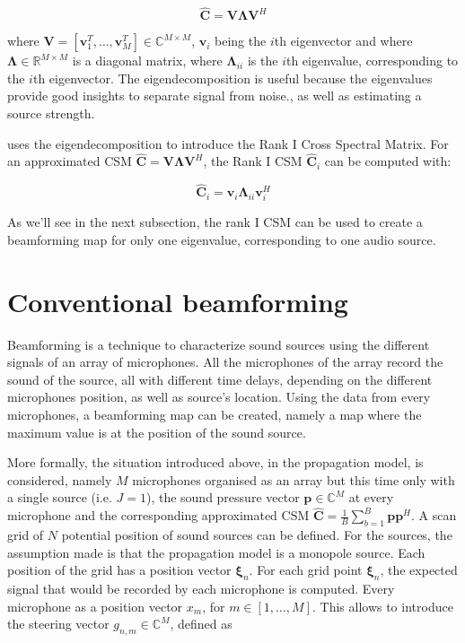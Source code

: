 \documentclass[11pt,a4paper,twoside]{report}
\begin{document}
\begin{equation}
    \label{eigendecomposition}
    \hat{\mathbf{C}} = \mathbf{V} \mathbf{\Lambda} \mathbf{V}^H
\end{equation}

where $\mathbf{V} = [\mathbf{v}_1^T, \dots, \mathbf{v}_M^T] \in \mathbb{C}^{M \times M}$, $\mathbf{v}_i$ being the $i$th eigenvector and where $\mathbf{\Lambda} \in \mathbb{R}^{M \times M}$ is a diagonal matrix, where $\mathbf{\Lambda}_{ii}$ is the $i$th eigenvalue, corresponding to the $i$th eigenvector. The eigendecomposition is useful because the eigenvalues provide good insights to separate signal from noise., as well as estimating a source strength. 

\cite{sarradj2010fast} uses the eigendecomposition to introduce the Rank I Cross Spectral Matrix. For an approximated CSM $\hat{\mathbf{C}} = \mathbf{V} \mathbf{\Lambda} \mathbf{V}^H$, the Rank I CSM $\hat{\mathbf{C}}_i$ can be computed with:

\begin{equation}
    \label{rank_I_csm}
    \hat{\mathbf{C}}_i = \mathbf{v}_i \mathbf{\Lambda}_{ii} \mathbf{v}_{i}^{H}
\end{equation}

As we'll see in the next subsection, the rank I CSM can be used to create a beamforming map for only one eigenvalue, corresponding to one audio source. 

\section{Conventional beamforming}

Beamforming is a technique to characterize sound sources using the different signals of an array of microphones. All the microphones of the array record the sound of the source, all with different time delays, depending on the different microphones position, as well as source's location. Using the data from every microphones, a beamforming map can be created, namely a map where the maximum value is at the position of the sound source.

More formally, the situation introduced above, in the propagation model, is considered, namely $M$ microphones organised as an array but this time only with a single source (i.e. $J = 1$), the sound pressure vector $\mathbf{p} \in \mathbb{C}^M$ at every microphone and the corresponding approximated CSM $\hat{\mathbf{C}} = \frac{1}{B} \sum_{b = 1}^{B} \mathbf{p}\mathbf{p}^H$. A scan grid of $N$ potential position of sound sources can be defined. For the sources, the assumption made is that the propagation model is a monopole source. Each position of the grid has a position vector $\mathbf{\xi}_n$. For each grid point $\mathbf{\xi}_n$, the expected signal that would be recorded by each microphone is computed. Every microphone as a position vector $x_m$, for $m \in [1, \dots, M]$. This allows to introduce the  steering vector $g_{n,m} \in \mathbb{C}^M$, defined as 
\end{document}
